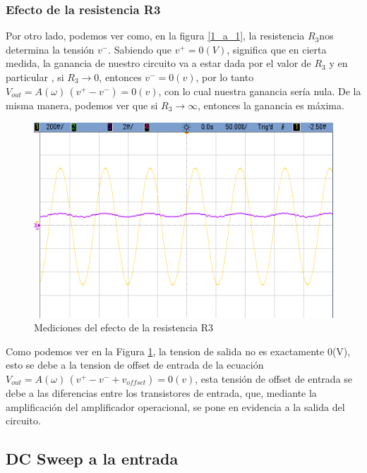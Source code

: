 \subsubsection{Efecto de la resistencia R3}

Por otro lado, podemos ver como, en la figura \ref{1_a_1}, la resistencia
$R_{3}$nos determina la tensión $v^{-}$. Sabiendo que $v^{+}=0(V)$,
significa que en cierta medida, la ganancia de nuestro circuito va
a estar dada por el valor de $R_{3}$ y en particular , si $R_{3}\longrightarrow0$,
entonces $v^{-}=0(v)$, por lo tanto $V_{out}=A(\omega)\,\left(v^{+}-v^{-}\right)=0(v)$,
con lo cual nuestra ganancia sería nula. De la misma manera, podemos
ver que si $R_{3}\longrightarrow\infty$, entonces la ganancia es
máxima.

\begin{figure}[H]
\begin{centering}
\includegraphics[scale=0.3]{../Ex1/iA/Resources1a/r3=0}
\par\end{centering}
\caption{Mediciones del efecto de la resistencia R3}
\label{1_a_23}
\end{figure}

Como podemos ver en la Figura \ref{1_a_23}, la tension de salida
no es exactamente 0(V), esto se debe a la tension de offset de entrada
de la ecuación $V_{out}=A(\omega)\,\left(v^{+}-v^{-}+v_{offset}\right)=0(v)$,
esta tensión de offset de entrada se debe a las diferencias entre
los transistores de entrada, que, mediante la amplificación del amplificador
operacional, se pone en evidencia a la salida del circuito.

\subsection{DC Sweep a la entrada}

